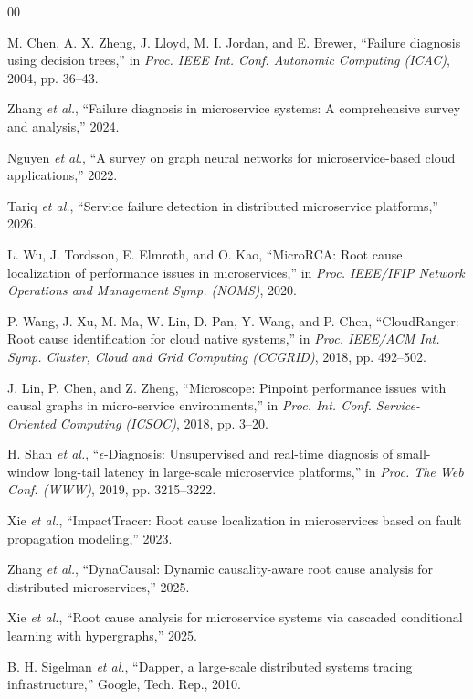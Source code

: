 \documentclass[conference]{IEEEtran}
\begin{document}
\begin{thebibliography}{00}

M. Chen, A. X. Zheng, J. Lloyd, M. I. Jordan, and E. Brewer, ``Failure diagnosis using decision trees,'' in \textit{Proc. IEEE Int. Conf. Autonomic Computing (ICAC)}, 2004, pp. 36--43.

Zhang \textit{et al.}, ``Failure diagnosis in microservice systems: A comprehensive survey and analysis,'' 2024.

Nguyen \textit{et al.}, ``A survey on graph neural networks for microservice-based cloud applications,'' 2022.

Tariq \textit{et al.}, ``Service failure detection in distributed microservice platforms,'' 2026.

L. Wu, J. Tordsson, E. Elmroth, and O. Kao, ``MicroRCA: Root cause localization of performance issues in microservices,'' in \textit{Proc. IEEE/IFIP Network Operations and Management Symp. (NOMS)}, 2020.

P. Wang, J. Xu, M. Ma, W. Lin, D. Pan, Y. Wang, and P. Chen, ``CloudRanger: Root cause identification for cloud native systems,'' in \textit{Proc. IEEE/ACM Int. Symp. Cluster, Cloud and Grid Computing (CCGRID)}, 2018, pp. 492--502.

J. Lin, P. Chen, and Z. Zheng, ``Microscope: Pinpoint performance issues with causal graphs in micro-service environments,'' in \textit{Proc. Int. Conf. Service-Oriented Computing (ICSOC)}, 2018, pp. 3--20.

H. Shan \textit{et al.}, ``$\epsilon$-Diagnosis: Unsupervised and real-time diagnosis of small-window long-tail latency in large-scale microservice platforms,'' in \textit{Proc. The Web Conf. (WWW)}, 2019, pp. 3215--3222.

Xie \textit{et al.}, ``ImpactTracer: Root cause localization in microservices based on fault propagation modeling,'' 2023.

Zhang \textit{et al.}, ``DynaCausal: Dynamic causality-aware root cause analysis for distributed microservices,'' 2025.

Xie \textit{et al.}, ``Root cause analysis for microservice systems via cascaded conditional learning with hypergraphs,'' 2025.

B. H. Sigelman \textit{et al.}, ``Dapper, a large-scale distributed systems tracing infrastructure,'' Google, Tech. Rep., 2010.


\end{thebibliography}
\end{document}
